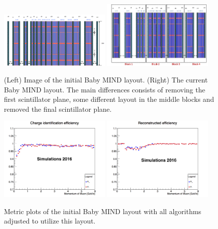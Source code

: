 \begin{figure}[h!]
\centering
\includegraphics[width=0.48\textwidth]{figures/oldStudies/oldMIND.png}
\includegraphics[width=0.48\textwidth]{figures/oldStudies/MINDetam.jpeg}
\caption{(Left) Image of the initial Baby MIND layout. (Right) The current Baby MIND layout. The main differences consists of removing the first scintillator plane, some different layout in the middle blocks and removed the final scintillator plane.}
\label{fig:oldMIND}
\end{figure}

\begin{figure}[h!]
\centering
\includegraphics[width=0.48\textwidth]{figures/oldStudies/oldChargeID.png}
\includegraphics[width=0.48\textwidth]{figures/oldStudies/oldRecEff.png}
\caption{Metric plots of the initial Baby MIND layout with all algorithms adjusted to utilize this layout.}
\label{fig:oldMIND2}
\end{figure}

